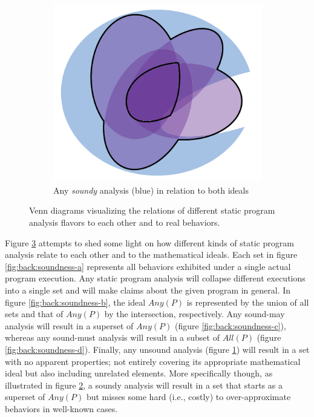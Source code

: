 \begin{figure}[htb!]
\begin{subfigure}{.47\textwidth}
    \label{fig:back:soundness-e}
\end{subfigure}
\hfill
\begin{subfigure}{.47\textwidth}
    \includegraphics[scale=.45]{assets/background/venn-soundness-f.pdf}
    \caption{Any \emph{soundy} analysis (blue) in relation to both ideals}
    \label{fig:back:soundness-f}
\end{subfigure}
\caption[Venn diagrams visualizing different program analysis notions and flavors]{Venn diagrams visualizing the relations of different static program analysis flavors to each other and to real behaviors.}
\label{fig:back:soundness}
\end{figure}

Figure \ref{fig:back:soundness} attempts to shed some light on how different kinds of static program analysis relate to each other and to the mathematical ideals. Each set in figure \ref{fig:back:soundness-a} represents all behaviors exhibited under a single actual program execution. Any static program analysis will collapse different executions into a single set and will make claims about the given program in general. In figure \ref{fig:back:soundness-b}, the ideal $Any(P)$ is represented by the union of all sets and that of $Any(P)$ by the intersection, respectively. Any sound-may analysis will result in a superset of $Any(P)$ (figure \ref{fig:back:soundness-c}), whereas any sound-must analysis will result in a subset of $All(P)$ (figure \ref{fig:back:soundness-d}). Finally, any unsound analysis (figure \ref{fig:back:soundness-e}) will result in a set with no apparent properties; not entirely covering its appropriate mathematical ideal but also including unrelated elements. More specifically though, as illustrated in figure \ref{fig:back:soundness-f}, a soundy analysis will result in a set that starts as a superset of $Any(P)$ but misses some hard (i.e., costly) to over-approximate behaviors in well-known cases.


